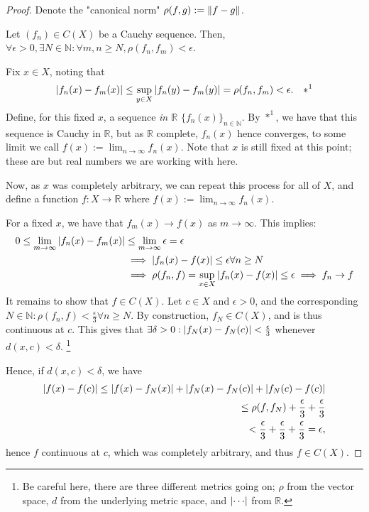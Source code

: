 \begin{proof}
    Denote the "canonical norm" $\rho(f, g) := \norm{f - g}$.

    Let $(f_n) \in C(X)$ be a Cauchy sequence. Then, $\forall \epsilon > 0, \exists N \in \mathbb{N} : \forall m, n \geq N, \rho(f_n, f_m) < \epsilon$.
    
    Fix $x \in X$, noting that \[
    \abs{f_n(x) - f_m(x)} \leq \sup_{y\in X} \abs{f_n(y) - f_m(y)} = \rho(f_n, f_m) < \epsilon. \quad \ast^1
    \]
    Define, for this fixed $x$, a sequence \emph{in $\mathbb{R}$} $\{f_n(x)\}_{n \in \mathbb{N}}$. By $\ast^1$, we have that this sequence is Cauchy in $\mathbb{R}$, but as $\mathbb{R}$ complete, $f_n(x)$ hence converges, to some limit we call $f(x) := \lim_{n\to \infty} f_n(x)$. Note that $x$ is still fixed at this point; these are but real numbers we are working with here.

    Now, as $x$ was completely arbitrary, we can repeat this process for all of $X$, and define a function $f : X \to \mathbb{R}$ where $f(x) := \lim_{n \to \infty} f_n(x)$.

    For a fixed $x$, we have that $f_m(x) \to f(x)$ as $m \to \infty$. This implies:
    \begin{align*}
        0 \leq \lim_{m \to \infty} \abs{f_n(x) - f_m(x)}& \leq \lim_{m \to \infty} \epsilon = \epsilon\\
        &\implies \abs{f_n(x) - f(x)} \leq \epsilon \forall n \geq N\\
        &\implies \rho(f_n, f) = \sup_{x \in X}\abs{f_n(x) - f(x)} \leq \epsilon \implies f_n \to f
    \end{align*}
    It remains to show that $f \in C(X)$. Let $c \in X$ and $\epsilon > 0$, and the corresponding $N \in \mathbb{N} : \rho(f_n, f) < \frac{\epsilon}{3} \forall n \geq N$. By construction, $f_N \in C(X)$, and is thus continuous at $c$. This gives that $\exists \delta > 0 : \abs{f_N(x) - f_N(c)} < \frac{\epsilon}{3}$ whenever $d(x, c) < \delta$. \footnote{Be careful here, there are three different metrics going on; $\rho$ from the vector space, $d$ from the underlying metric space, and $\abs{\cdots}$ from $\mathbb{R}$.}

    Hence, if $d(x, c) < \delta$, we have \begin{align*}
        \abs{f(x) - f(c)} \leq \abs{f(x) - f_N(x)} + \abs{f_N(x) - f_N(c)} + \abs{f_N(c) - f(c)}\\
        \leq \rho(f, f_N) + \frac{\epsilon}{3} + \frac{\epsilon}{3}\\
        < \frac{\epsilon}{3} + \frac{\epsilon}{3} + \frac{\epsilon}{3} = \epsilon,
    \end{align*}
   hence $f$ continuous at $c$, which was completely arbitrary, and thus $f \in C(X)$.
\end{proof}

